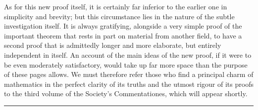 As for this new proof itself, it is certainly far inferior to the earlier one in simplicity and brevity; but this circumstance lies in the nature of the subtle investigation itself. It is always gratifying, alongside a very simple proof of the important theorem that rests in part on material from another field, to have a second proof that is admittedly longer and more elaborate, but entirely independent in itself. An account of the main ideas of the new proof, if it were to be even moderately satisfactory, would take up far more space than the purpose of these pages allows. We must therefore refer those who find a principal charm of mathematics in the perfect clarity of its truths and the utmost rigour of its proofs to the third volume of the Society's Commentationes, which will appear shortly.
\begin{center}\rule{0.28\linewidth}{0.4pt}\end{center}
